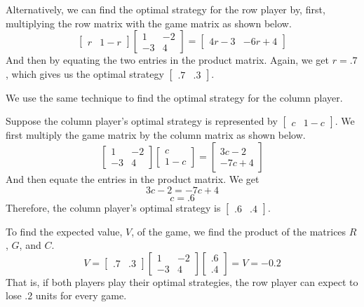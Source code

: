 \begin{solution}
    Alternatively, we can find the optimal strategy for the row player by, first, multiplying the row matrix with the game matrix as shown below.
    \[
        \begin{bmatrix} r & 1-r \end{bmatrix} \begin{bmatrix} 1 & -2 \\ -3 & 4 \end{bmatrix} = \begin{bmatrix} 4r - 3 & -6r + 4 \end{bmatrix}
    \]
    And then by equating the two entries in the product matrix. Again, we get \( r = .7 \), which gives us the optimal strategy \( \begin{bmatrix} .7 & .3 \end{bmatrix} \).

    We use the same technique to find the optimal strategy for the column player.

    Suppose the column player's optimal strategy is represented by \( \begin{bmatrix} c & 1-c \end{bmatrix} \). We first multiply the game matrix by the column matrix as shown below.
    \[
        \begin{bmatrix}
            1  & -2 \\
            -3 & 4
        \end{bmatrix}
        \begin{bmatrix}
            c \\
            1-c
        \end{bmatrix}
        =
        \begin{bmatrix}
            3c-2 \\
            -7c+4
        \end{bmatrix}
    \]
    And then equate the entries in the product matrix. We get
    \[
        3c - 2 = -7c + 4
    \]
    \[
        c = .6
    \]
    Therefore, the column player's optimal strategy is \( \begin{bmatrix} .6 & .4 \end{bmatrix} \).

    To find the expected value, \( V \), of the game, we find the product of the matrices \( R \), \( G \), and \( C \).
    \[
        V =
        \begin{bmatrix} .7 & .3 \end{bmatrix}
        \begin{bmatrix}
            1  & -2 \\
            -3 & 4
        \end{bmatrix}
        \begin{bmatrix}
            .6 \\
            .4
        \end{bmatrix}
        = V = -0.2
    \]
    That is, if both players play their optimal strategies, the row player can expect to lose .2 units for every game.

\end{solution}


